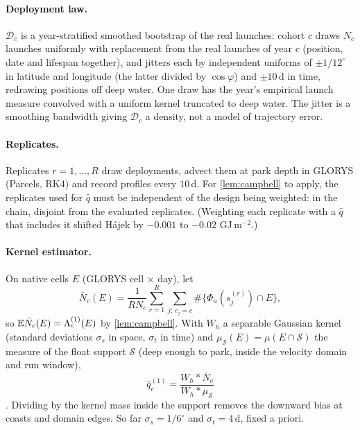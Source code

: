 \paragraph{Deployment law.} $\mathcal D_c$ is a year-stratified smoothed bootstrap of the real launches:
cohort $c$ draws $N_c$ launches uniformly with replacement from the real launches of year $c$ (position,
date and lifespan together), and jitters each by independent uniforms of $\pm1/12^\circ$ in latitude and
longitude (the latter divided by $\cos\varphi$) and $\pm10$\,d in time, redrawing positions off deep
water. One draw has the year's empirical launch measure convolved with a uniform kernel truncated to
deep water. The jitter is a smoothing bandwidth giving $\mathcal D_c$ a density, not a model of
trajectory error.

\paragraph{Replicates.} Replicates $r=1,\dots,R$ draw deployments, advect them at park depth in GLORYS
(Parcels, RK4) and record profiles every $10$\,d. For \cref{lem:campbell} to apply, the replicates used
for $\hat q$ must be independent of the design being weighted: in the chain, disjoint from the evaluated
replicates. (Weighting each replicate with a $\hat q$ that includes it shifted Hájek by $-0.001$ to
$-0.02$ GJ\,m$^{-2}$.)

\paragraph{Kernel estimator.} On native cells $E$ (GLORYS cell $\times$ day), let
\[
  \bar N_c(E)=\frac1{RN_c}\sum_{r=1}^R\sum_{j:\,c_j=c}\#\{\Phi_u(s_j^{(r)})\cap E\},
\]
so $\mathbb{E}\bar N_c(E)=\Lambda^{(1)}_c(E)$ by \cref{lem:campbell}. With $W_h$ a separable Gaussian kernel (standard deviations $\sigma_s$ in space,
$\sigma_t$ in time) and $\mu_{\mathcal S}(E)=\mu(E\cap\mathcal S)$ the measure of the float support
$\mathcal S$ (deep enough to park, inside the velocity domain and run window),
\[
  \hat q^{(1)}_c=\frac{W_h*\bar N_c}{W_h*\mu_{\mathcal S}}
\]
\citep{diggle1985}. Dividing by the kernel mass inside the support removes the downward bias at coasts
and domain edges. So far $\sigma_s=1/6^\circ$ and $\sigma_t=4$\,d, fixed a priori.

